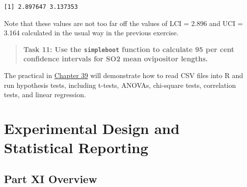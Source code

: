\documentclass[
]{scrbook}
\begin{document}
\begin{verbatim}
[1] 2.897647 3.137353
\end{verbatim}

Note that these values are not too far off the values of LCI = 2.896 and UCI = 3.164 calculated in the usual way in the previous exercise.

\begin{quote}
\textbf{Task 11: Use the \texttt{simpleboot} function to calculate 95 per cent confidence intervals for SO2 mean ovipositor lengths.}
\end{quote}

The practical in \protect\hyperlink{Chapter_39}{Chapter 39} will demonstrate how to read CSV files into R and run hypothesis tests, including t-tests, ANOVAs, chi-square tests, correlation tests, and linear regression.

\hypertarget{part-experimental-design-and-statistical-reporting}{%
\part{Experimental Design and Statistical Reporting}\label{part-experimental-design-and-statistical-reporting}}

\hypertarget{Week12}{%
\chapter*{Part XI Overview}\label{Week12}}
\end{document}
